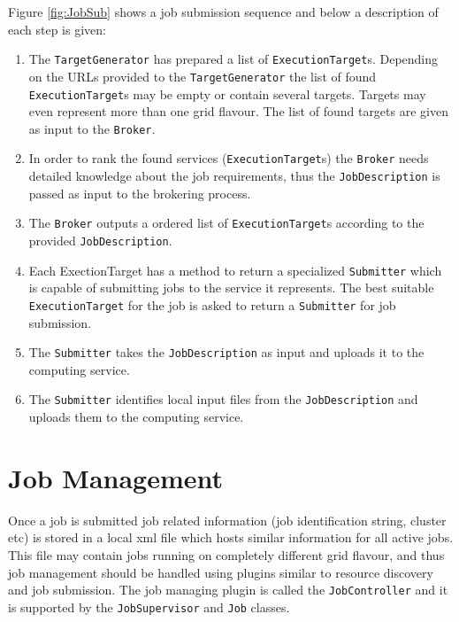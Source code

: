 \documentclass{book}
\newcommand{\TargetGenerator}{\texttt{TargetGenerator}}
\newcommand{\ExecutionTarget}{\texttt{ExecutionTarget}}
\newcommand{\Broker}{\texttt{Broker}}
\newcommand{\Submitter}{\texttt{Submitter}}
\newcommand{\JobDescription}{\texttt{JobDescription}}
\newcommand{\JobSupervisor}{\texttt{JobSupervisor}}
\newcommand{\JobController}{\texttt{JobController}}
\newcommand{\Job}{\texttt{Job}}
\begin{document}
Figure \ref{fig:JobSub} shows a job submission sequence and below a description of each step is given:

\begin{enumerate}
\item{The {\TargetGenerator} has prepared a list of {\ExecutionTarget}s. Depending on the URLs provided to the {\TargetGenerator} the list of 
found {\ExecutionTarget}s may be empty or contain several targets. Targets may even represent more than one grid flavour. The list of 
found targets are given as input to the {\Broker}.}
\item{In order to rank the found services ({\ExecutionTarget}s) the {\Broker} needs detailed knowledge about the job requirements, thus the 
{\JobDescription} is passed as input to the brokering process.}
\item{The {\Broker} outputs a ordered list of {\ExecutionTarget}s according to the provided {\JobDescription}.}
\item{Each ExectionTarget has a method to return a specialized {\Submitter} which is capable of submitting jobs to the service it 
represents. The best suitable {\ExecutionTarget} for the job is asked to return a {\Submitter} for job submission.}
\item{The {\Submitter} takes the {\JobDescription} as input and uploads it to the computing service.}
\item{The {\Submitter} identifies local input files from the {\JobDescription} and uploads them to the computing service.}
\end{enumerate}

\section{Job Management}
Once a job is submitted job related information (job identification string, cluster etc) is stored in a local xml file which hosts 
similar information for all active jobs. This file may contain jobs running on completely different grid flavour, and thus job 
management should be handled using plugins similar to resource discovery and job submission. The job managing plugin is called 
the {\JobController} and it is supported by the {\JobSupervisor} and {\Job} classes.
\end{document}
